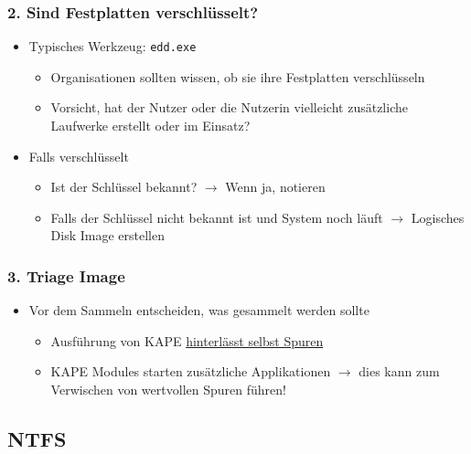 \subsubsection{2. Sind Festplatten verschlüsselt?}
\begin{itemize}
    \item Typisches Werkzeug: \lstinline|edd.exe|
    \begin{itemize}
        \item Organisationen sollten wissen, ob sie ihre Festplatten verschlüsseln
        \item Vorsicht, hat der Nutzer oder die Nutzerin vielleicht zusätzliche Laufwerke erstellt oder im Einsatz?
    \end{itemize}
    \item Falls verschlüsselt
    \begin{itemize}
        \item Ist der Schlüssel bekannt? $\rightarrow$ Wenn ja, notieren
        \item Falls der Schlüssel nicht bekannt ist und System noch läuft $\rightarrow$ Logisches Disk Image erstellen
    \end{itemize}
\end{itemize}

\subsubsection{3. Triage Image}
\begin{itemize}
    \item Vor dem Sammeln entscheiden, was gesammelt werden sollte
    \begin{itemize}
        \item Ausführung von KAPE \underline{hinterlässt selbst Spuren}
        \item KAPE Modules starten zusätzliche Applikationen $\rightarrow$ dies kann zum Verwischen von wertvollen Spuren führen!
    \end{itemize}
\end{itemize}

\subsection{NTFS}

